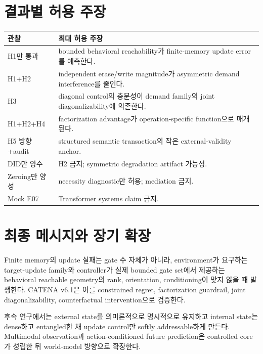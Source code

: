 \documentclass[10.5pt,a4paper]{article}
\begin{document}
\section{결과별 허용 주장}
\begin{longtable}{p{62mm}p{87mm}}
\toprule
관찰 & 최대 허용 주장 \\
\midrule
H1만 통과 & bounded behavioral reachability가 finite-memory update error를 예측한다. \\
H1+H2 & independent erase/write magnitude가 asymmetric demand interference를 줄인다. \\
H3 & diagonal control의 충분성이 demand family의 joint diagonalizability에 의존한다. \\
H1+H2+H4 & factorization advantage가 operation-specific function으로 매개된다. \\
H5 방향+audit & structured semantic transaction의 작은 external-validity anchor. \\
DID만 양수 & H2 금지; symmetric degradation artifact 가능성. \\
Zeroing만 양성 & necessity diagnostic만 허용; mediation 금지. \\
Mock E07 & Transformer systems claim 금지. \\
\bottomrule
\end{longtable}

\section{최종 메시지와 장기 확장}
\begin{claimbox}
Finite memory의 update 실패는 gate 수 자체가 아니라, environment가 요구하는 target-update family와 controller가 실제 bounded gate set에서 제공하는 behavioral reachable geometry의 rank, orientation, conditioning이 맞지 않을 때 발생한다. CATENA v6.1은 이를 constrained regret, factorization guardrail, joint diagonalizability, counterfactual intervention으로 검증한다.
\end{claimbox}

후속 연구에서는 external state를 의미론적으로 명시적으로 유지하고 internal state는 dense하고 entangled한 채 update control만 softly addressable하게 만든다. Multimodal observation과 action-conditioned future prediction은 controlled core가 성립한 뒤 world-model 방향으로 확장한다.

\begingroup
\sloppy
\printbibliography
\endgroup
\end{document}

